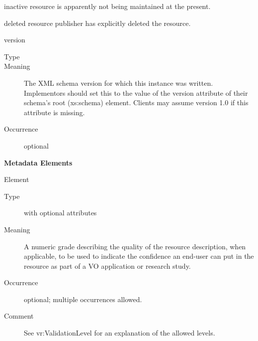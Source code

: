 \documentclass[11pt,a4paper]{ivoa}
\begin{document}
\begin{generated}
\begin{bigdescription}
\begin{description}
\begin{longtermsdescription}
\item[inactive]
                     resource is apparently not being maintained at the present.
                   
\item[deleted]
                      resource publisher has explicitly deleted the resource.
                   
\end{longtermsdescription}
\end{description}
\item[version]
\begin{description}
\item[Type] 
\item[Meaning] 
               The XML schema version for which this instance was written.
               Implementors should set this to the value of the version
               attribute of their schema's root (xs:schema) element.
               Clients may assume version 1.0 if this attribute is 
               missing.
            
\item[Occurrence] optional
\end{description}


\end{bigdescription}\endgroup



\vspace{0.5ex}\noindent\textbf{ Metadata Elements}

\begingroup\small\begin{bigdescription}\item[Element \xmlel{validationLevel}]
\begin{description}
\item[Type]  with optional attributes
\item[Meaning] 
                  A numeric grade describing the quality of the
                  resource description, when applicable, 
                  to be used to indicate the confidence an end-user
                  can put in the resource as part of a VO application
                  or research study. 
               
\item[Occurrence] optional; multiple occurrences allowed.
\item[Comment] 
                  See vr:ValidationLevel for an explanation of the
                  allowed levels.  
               

\end{description}
\end{bigdescription}
\end{generated}
\end{document}
